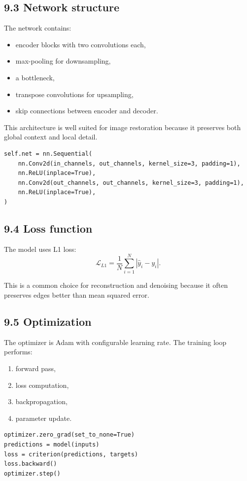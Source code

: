 \documentclass[12pt,a4paper]{article}
\begin{document}
\subsection*{9.3 Network structure}
The network contains:
\begin{itemize}[leftmargin=*]
\item encoder blocks with two convolutions each,
\item max-pooling for downsampling,
\item a bottleneck,
\item transpose convolutions for upsampling,
\item skip connections between encoder and decoder.
\end{itemize}

This architecture is well suited for image restoration because it preserves both global context and local detail.

\begin{lstlisting}[style=py,caption={U-Net block idea}]
self.net = nn.Sequential(
    nn.Conv2d(in_channels, out_channels, kernel_size=3, padding=1),
    nn.ReLU(inplace=True),
    nn.Conv2d(out_channels, out_channels, kernel_size=3, padding=1),
    nn.ReLU(inplace=True),
)
\end{lstlisting}

\subsection*{9.4 Loss function}
The model uses L1 loss:
\[
\mathcal{L}_{L1} = \frac{1}{N}\sum_{i=1}^N |\hat{y}_i - y_i|.
\]

This is a common choice for reconstruction and denoising because it often preserves edges better than mean squared error.

\subsection*{9.5 Optimization}
The optimizer is Adam with configurable learning rate. The training loop performs:
\begin{enumerate}[leftmargin=*]
\item forward pass,
\item loss computation,
\item backpropagation,
\item parameter update.
\end{enumerate}

\begin{lstlisting}[style=py,caption={Training step}]
optimizer.zero_grad(set_to_none=True)
predictions = model(inputs)
loss = criterion(predictions, targets)
loss.backward()
optimizer.step()
\end{lstlisting}
\end{document}
